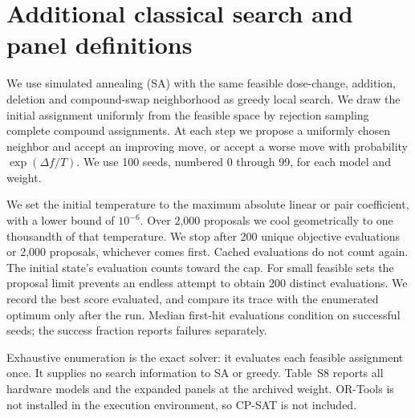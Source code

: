 \clearpage
\section{Additional classical search and panel definitions}
We use simulated annealing (SA) with the same feasible dose-change, addition, deletion and compound-swap neighborhood as greedy local search. We draw the initial assignment uniformly from the feasible space by rejection sampling complete compound assignments. At each step we propose a uniformly chosen neighbor and accept an improving move, or accept a worse move with probability $\exp(\Delta f/T)$. We use 100 seeds, numbered 0 through 99, for each model and weight.

We set the initial temperature to the maximum absolute linear or pair coefficient, with a lower bound of $10^{-6}$. Over 2,000 proposals we cool geometrically to one thousandth of that temperature. We stop after 200 unique objective evaluations or 2,000 proposals, whichever comes first. Cached evaluations do not count again. The initial state's evaluation counts toward the cap. For small feasible sets the proposal limit prevents an endless attempt to obtain 200 distinct evaluations. We record the best score evaluated, and compare its trace with the enumerated optimum only after the run. Median first-hit evaluations condition on successful seeds; the success fraction reports failures separately.

Exhaustive enumeration is the exact solver: it evaluates each feasible assignment once. It supplies no search information to SA or greedy. Table~S8 reports all hardware models and the expanded panels at the archived weight. OR-Tools is not installed in the execution environment, so CP-SAT is not included.

